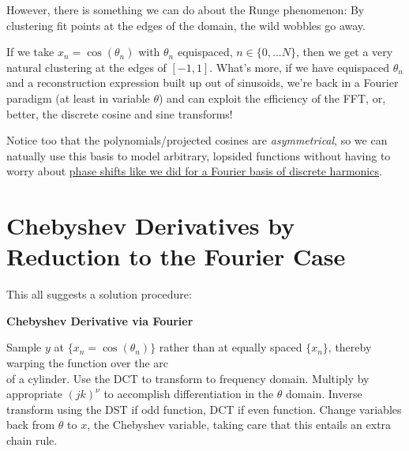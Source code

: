 \documentclass[10pt]{article}
\begin{document}
However, there is something we can do about the Runge phenomenon: By clustering fit points at the edges of the domain, the wild wobbles go away.

If we take $x_n = \cos(\theta_n)$ with $\theta_n$ equispaced, $n \in \{0, ...N\}$, then we get a very natural clustering at the edges of $[-1, 1]$. What's more, if we have equispaced $\theta_n$ and a reconstruction expression built up out of sinusoids, we're back in a Fourier paradigm (at least in variable $\theta$) and can exploit the efficiency of the FFT, or, better, the discrete cosine and sine transforms!\cite{dct}\cite{dst}

Notice too that the polynomials/projected cosines are \textit{asymmetrical}, so we can natually use this basis to model arbitrary, lopsided functions without having to worry about \hyperref[phase]{phase shifts like we did for a Fourier basis of discrete harmonics}.

\section{Chebyshev Derivatives by Reduction to the Fourier Case}\label{algo}

This all suggests a solution procedure:

\begin{algorithm}
\caption*{\textbf{Chebyshev Derivative via Fourier}}
\begin{algorithmic}[1] %
\STATE Sample $y$ at $\{x_n = \cos(\theta_n)\}$ rather than at equally spaced $\{x_n\}$, thereby warping the function over the arc\\of a cylinder.
\STATE Use the DCT to transform to frequency domain.
\STATE Multiply by appropriate $(jk)^\nu$ to accomplish differentiation in the $\theta$ domain.
\STATE Inverse transform using the DST if odd function, DCT if even function.
\STATE Change variables back from $\theta$ to $x$, the Chebyshev variable, taking care that this entails an extra chain rule.
\end{algorithmic}
\end{algorithm}\pagebreak
\end{document}
